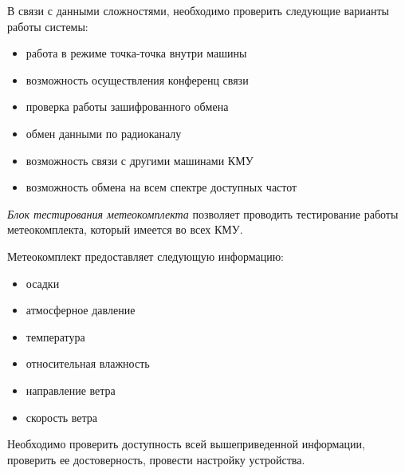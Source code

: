 В связи с данными сложностями, необходимо проверить следующие варианты работы системы:
\begin{itemize}
	\item работа в режиме точка-точка внутри машины
	\item возможность осуществления конференц связи
	\item проверка работы зашифрованного обмена
	\item обмен данными по радиоканалу
	\item возможность связи с другими машинами КМУ
	\item возможность обмена на всем спектре доступных частот
\end{itemize}

\textit{Блок тестирования метеокомплекта} позволяет проводить тестирование работы метеокомплекта, который имеется во
всех КМУ.

Метеокомплект предоставляет следующую информацию:
\begin{itemize}
	\item осадки
	\item атмосферное давление
	\item температура
	\item относительная влажность
	\item направление ветра
	\item скорость ветра
\end{itemize}

Необходимо проверить доступность всей вышеприведенной информации, проверить ее достоверность, провести настройку
устройства.

